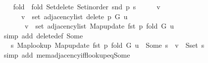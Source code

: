 \begin{isabellebody}
\ \ \isamarkupfalse%
\ {\isacharquery}{\kern0pt}fold\ {\isacharequal}{\kern0pt}\ {\isachardoublequoteopen}fold\ Set{\isacharunderscore}{\kern0pt}delete\ {\isacharparenleft}{\kern0pt}Set{\isacharunderscore}{\kern0pt}inorder\ {\isacharparenleft}{\kern0pt}snd\ p{\isacharparenright}{\kern0pt}{\isacharparenright}{\kern0pt}\ s{\isacharprime}{\kern0pt}{\isachardoublequoteclose}\isanewline
\ \ \isacommand{{\isacharbraceleft}{\kern0pt}}\isamarkupfalse%
\ \isamarkupfalse%
\ v\isanewline
\ \ \ \ \isamarkupfalse%
\isanewline
\ \ \ \ \ \ {\isachardoublequoteopen}v\ {\isasymin}\ set\ {\isacharparenleft}{\kern0pt}adjacency{\isacharunderscore}{\kern0pt}list\ {\isacharparenleft}{\kern0pt}delete{\isacharunderscore}{\kern0pt}{}\ p\ G{\isacharparenright}{\kern0pt}\ u{\isacharparenright}{\kern0pt}\ {\isasymlongleftrightarrow}\isanewline
\ \ \ \ \ \ \ v\ {\isasymin}\ set\ {\isacharparenleft}{\kern0pt}adjacency{\isacharunderscore}{\kern0pt}list\ {\isacharparenleft}{\kern0pt}Map{\isacharunderscore}{\kern0pt}update\ {\isacharparenleft}{\kern0pt}fst\ p{\isacharparenright}{\kern0pt}\ {\isacharquery}{\kern0pt}fold\ G{\isacharparenright}{\kern0pt}\ u{\isacharparenright}{\kern0pt}{\isachardoublequoteclose}\isanewline
\ \ \ \ \ \ \isamarkupfalse%
\ {\isacharparenleft}{\kern0pt}simp\ add{\isacharcolon}{\kern0pt}\ delete{\isacharunderscore}{\kern0pt}{}{\isacharunderscore}{\kern0pt}def\ Some{\isacharparenright}{\kern0pt}\isanewline
\ \ \ \ \isamarkupfalse%
\ \isamarkupfalse%
\ {\isachardoublequoteopen}{\isachardot}{\kern0pt}{\isachardot}{\kern0pt}{\isachardot}{\kern0pt}\ {\isasymlongleftrightarrow}\ {\isacharparenleft}{\kern0pt}{\isasymexists}s{\isachardot}{\kern0pt}\ Map{\isacharunderscore}{\kern0pt}lookup\ {\isacharparenleft}{\kern0pt}Map{\isacharunderscore}{\kern0pt}update\ {\isacharparenleft}{\kern0pt}fst\ p{\isacharparenright}{\kern0pt}\ {\isacharquery}{\kern0pt}fold\ G{\isacharparenright}{\kern0pt}\ u\ {\isacharequal}{\kern0pt}\ Some\ s\ {\isasymand}\ v\ {\isasymin}\ S{\isachardot}{\kern0pt}set\ s{\isacharparenright}{\kern0pt}{\isachardoublequoteclose}\isanewline
\ \ \ \ \ \ \isamarkupfalse%
\ {\isacharparenleft}{\kern0pt}simp\ add{\isacharcolon}{\kern0pt}\ mem{\isacharunderscore}{\kern0pt}adjacency{\isacharunderscore}{\kern0pt}iff{\isacharunderscore}{\kern0pt}lookup{\isacharunderscore}{\kern0pt}eq{\isacharunderscore}{\kern0pt}Some{\isacharparenright}{\kern0pt}\isanewline
\ \ \ \ \isamarkupfalse%
\ \isamarkupfalse%

\end{isabellebody}
